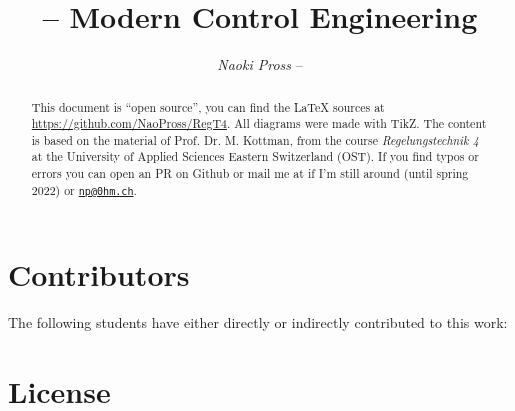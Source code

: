 \documentclass[margin=tiny]{tex/hsrzf}
\author{\textsl{Naoki Pross} -- \texttt{\theauthoremail}}
\title{\texttt{\themodule} -- Modern Control Engineering}
\date{\thesemester}
\begin{document}

\maketitle

\begin{abstract}
  This document is ``open source'', you can find the \LaTeX{} sources at \url{https://github.com/NaoPross/RegT4}. All diagrams were made with TikZ.  The content is based on the material of Prof. Dr. M. Kottman, from the course \emph{Regelungstechnik 4} at the University of Applied Sciences Eastern Switzerland (OST). If you find typos or errors you can open an PR on Github or mail me at \href{mailto:\theauthoremail}{\texttt{\theauthoremail}} if I'm still around (until spring 2022) or \href{mailto:np@0hm.ch}{\texttt{np@0hm.ch}}.
\end{abstract}

\section*{Contributors}

The following students have either directly or indirectly contributed to this work: \thecontributors

\section*{License}
\doclicenseThis

\tableofcontents

\clearpage
\twocolumn

\setcounter{page}{1}





\appendix






\onecolumn

\end{document}
